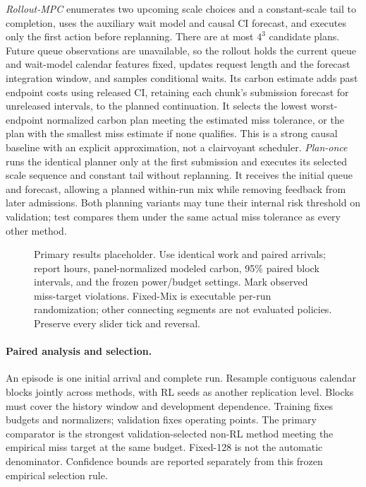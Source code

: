 \emph{Rollout-MPC} enumerates two upcoming scale choices and a constant-scale
tail to completion, uses the auxiliary wait model and causal CI forecast, and executes
only the first action before replanning. There are at most $4^3$ candidate
plans. Future queue observations are unavailable, so the rollout holds the
current queue and wait-model calendar features fixed, updates request length
and the forecast integration window, and samples conditional waits. Its carbon
estimate adds past endpoint costs using released CI, retaining each chunk's
submission forecast for unreleased intervals, to the planned continuation. It selects the
lowest worst-endpoint normalized carbon plan meeting the estimated miss tolerance, or the
plan with the smallest miss estimate if none qualifies. This is a strong
causal baseline with an explicit approximation, not a clairvoyant scheduler.
\emph{Plan-once} runs the identical planner only at the first submission and
executes its selected scale sequence and constant tail without replanning.
It receives the initial queue and forecast, allowing a planned within-run
mix while removing feedback from later admissions. Both planning variants
may tune their internal risk threshold on validation; test compares them
under the same actual miss tolerance as every other method.

\begin{figure}[t]
\centering
{}
\caption{Primary results placeholder. Use identical work and paired arrivals;
report hours, panel-normalized modeled carbon, 95\% paired block intervals,
and the frozen power/budget settings. Mark observed miss-target violations.
Fixed-Mix is executable per-run randomization; other connecting segments are
not evaluated policies. Preserve every slider tick and reversal.}
\label{fig:main}
\end{figure}

\paragraph{Paired analysis and selection.}
An episode is one initial arrival and complete run. Resample contiguous calendar
blocks jointly across methods, with RL seeds as another replication level.
Blocks must cover the history window and development dependence. Training fixes
budgets and normalizers; validation fixes operating points. The primary
comparator is the strongest validation-selected non-RL method meeting the
empirical miss target at the same budget. Fixed-128 is not the automatic
denominator. Confidence bounds are reported separately from this frozen
empirical selection rule.

